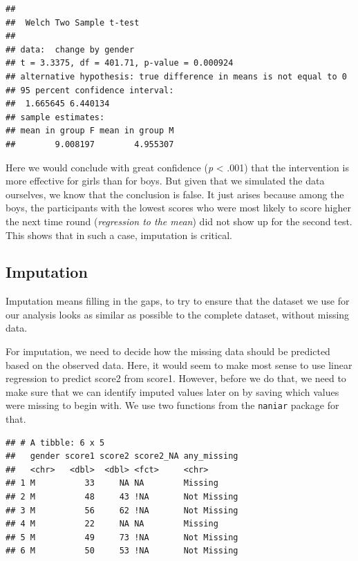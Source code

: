 \documentclass[
]{book}
\newenvironment{Shaded}{\begin{snugshade}}{\end{snugshade}}
\newcommand{\DataTypeTok}[1]{\textcolor[rgb]{0.13,0.29,0.53}{#1}}
\newcommand{\KeywordTok}[1]{\textcolor[rgb]{0.13,0.29,0.53}{\textbf{#1}}}
\newcommand{\NormalTok}[1]{#1}
\newcommand{\OperatorTok}[1]{\textcolor[rgb]{0.81,0.36,0.00}{\textbf{#1}}}
\newcommand{\OtherTok}[1]{\textcolor[rgb]{0.56,0.35,0.01}{#1}}
\newcommand{\StringTok}[1]{\textcolor[rgb]{0.31,0.60,0.02}{#1}}
\begin{document}
\begin{verbatim}
## 
## 	Welch Two Sample t-test
## 
## data:  change by gender
## t = 3.3375, df = 401.71, p-value = 0.000924
## alternative hypothesis: true difference in means is not equal to 0
## 95 percent confidence interval:
##  1.665645 6.440134
## sample estimates:
## mean in group F mean in group M 
##        9.008197        4.955307
\end{verbatim}

Here we would conclude with great confidence (\emph{p} \textless{} .001) that the intervention is more effective for girls than for boys. But given that we simulated the data ourselves, we know that the conclusion is false. It just arises because among the boys, the participants with the lowest scores who were most likely to score higher the next time round (\emph{regression to the mean}) did not show up for the second test. This shows that in such a case, imputation is critical.

\hypertarget{imputation}{%
\subsection{Imputation}\label{imputation}}

Imputation means filling in the gaps, to try to ensure that the dataset we use for our analysis looks as similar as possible to the complete dataset, without missing data.

For imputation, we need to decide how the missing data should be predicted based on the observed data. Here, it would seem to make most sense to use linear regression to predict score2 from score1. However, before we do that, we need to make sure that we can identify imputed values later on by saving which values were missing to begin with. We use two functions from the \texttt{naniar} package for that.

\begin{Shaded}
\end{Shaded}

\begin{verbatim}
## # A tibble: 6 x 5
##   gender score1 score2 score2_NA any_missing
##   <chr>   <dbl>  <dbl> <fct>     <chr>      
## 1 M          33     NA NA        Missing    
## 2 M          48     43 !NA       Not Missing
## 3 M          56     62 !NA       Not Missing
## 4 M          22     NA NA        Missing    
## 5 M          49     73 !NA       Not Missing
## 6 M          50     53 !NA       Not Missing
\end{verbatim}
\end{document}
